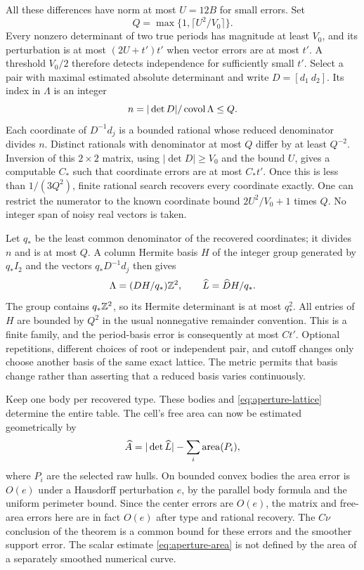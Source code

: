 All these differences have norm at most $U=12B$ for small errors.
Set
\begin{equation}\label{eq:aperture-Q}
                     Q=\max\{1,\lceil U^2/V_0\rceil\}.
\end{equation}
Every nonzero determinant of two true periods has magnitude at least
$V_0$, and its perturbation is at most $(2U+t')t'$ when vector errors
are at most $t'$. A threshold $V_0/2$ therefore detects independence
for sufficiently small $t'$. Select a pair with maximal estimated
absolute determinant and write $D=[d_1\ d_2]$. Its index in $\Lambda$
is an integer
\[
                    n=|\det D|/\operatorname{covol}\Lambda\le Q.
\]
Each coordinate of $D^{-1}d_j$ is a bounded rational whose reduced
denominator divides $n$. Distinct rationals with denominator at most
$Q$ differ by at least $Q^{-2}$. Inversion of this $2\times2$ matrix,
using $|\det D|\ge V_0$ and the bound $U$, gives a computable $C_*$
such that coordinate errors are at most $C_*t'$. Once this is less
than $1/(3Q^2)$, finite rational search recovers every coordinate
exactly. One can restrict the numerator to the known coordinate bound
$2U^2/V_0+1$ times $Q$. No integer span of noisy real vectors is taken.

Let $q_*$ be the least common denominator of the recovered coordinates;
it divides $n$ and is at most $Q$. A column Hermite basis $H$ of the
integer group generated by $q_*I_2$ and the vectors $q_*D^{-1}d_j$
then gives
\begin{equation}\label{eq:aperture-lattice}
          \Lambda=(D H/q_*)\mathbb Z^2,\qquad
          \widehat L=\widehat D H/q_*.
\end{equation}
The group contains $q_*\mathbb Z^2$, so its Hermite determinant is at most
$q_*^2$. All entries of $H$ are bounded by $Q^2$ in the usual
nonnegative remainder convention. This is a finite family, and the
period-basis error is consequently at most $C t'$. Optional repetitions,
different choices of root or independent pair, and cutoff changes only
choose another basis of the same exact lattice. The metric permits
that basis change rather than asserting that a reduced basis varies
continuously.

Keep one body per recovered type. These bodies and
\eqref{eq:aperture-lattice} determine the entire table. The cell's free
area can now be estimated geometrically by
\begin{equation}\label{eq:aperture-area}
              \widehat A=|\det\widehat L|-\sum_i\operatorname{area}(P_i),
\end{equation}
where $P_i$ are the selected raw hulls. On bounded convex bodies the
area error is $O(e)$ under a Hausdorff perturbation $e$, by the parallel
body formula and the uniform perimeter bound. Since the center errors
are $O(e)$, the matrix and free-area errors here are in fact $O(e)$
after type and rational recovery. The $C\nu$ conclusion of the theorem
is a common bound for these errors and the smoother support error.
The scalar estimate \eqref{eq:aperture-area} is not defined by the area
of a separately smoothed numerical curve.

